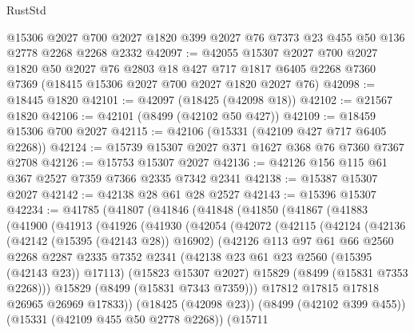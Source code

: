 \begin{lexlean}{RustStd}
\begin{coremodule}
    @15306
    @2027
    @700
    @2027
    @1820
    @399
    @2027
    @76
    @7373
    @23
    @455
    @50
    @136
    @2778
    @2268
    @2268
    @2332
@42097 := @42055
    @15307
    @2027
    @700
    @2027
    @1820
    @50
    @2027
    @76
    @2803
    @18
    @427
    @717
    @1817
    @6405
    @2268
    @7360
    @7369
    (@18415 @15306 @2027 @700 @2027 @1820 @2027 @76)
@42098 := @18445 @1820
@42101 := @42097 (@18425 (@42098 @18))
@42102 := @21567 @1820
@42106 := @42101 (@8499 (@42102 @50 @427))
@42109 := @18459 @15306 @700 @2027
@42115 := @42106 (@15331 (@42109 @427 @717 @6405 @2268))
@42124 := @15739 @15307 @2027 @371 @1627 @368 @76 @7360 @7367 @2708
@42126 := @15753 @15307 @2027
@42136 := @42126 @156 @115 @61 @367 @2527 @7359 @7366 @2335 @7342 @2341
@42138 := @15387 @15307 @2027
@42142 := @42138 @28 @61 @28 @2527
@42143 := @15396 @15307
@42234 := @41785
    (@41807
      (@41846
        (@41848
          (@41850
            (@41867
              (@41883
                (@41900
                  (@41913
                    (@41926
                      (@41930
                        (@42054
                          (@42072
                            (@42115
                              (@42124
                                (@42136
                                  (@42142 (@15395 (@42143 @28)) @16902)
                                  (@42126
                                    @113
                                    @97
                                    @61
                                    @66
                                    @2560
                                    @2268
                                    @2287
                                    @2335
                                    @7352
                                    @2341
                                    (@42138 @23 @61 @23 @2560 (@15395 (@42143 @23)) @17113)
                                    (@15823 @15307 @2027)
                                    @15829
                                    (@8499 (@15831 @7353 @2268)))
                                  @15829
                                  (@8499 (@15831 @7343 @7359)))
                                @17812
                                @17815
                                @17818
                                @26965
                                @26969
                                @17833))
                            (@18425 (@42098 @23))
                            (@8499 (@42102 @399 @455))
                            (@15331 (@42109 @455 @50 @2778 @2268))
                            (@15711

\end{coremodule}
\end{lexlean}
